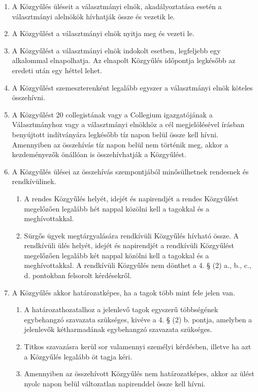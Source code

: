 \documentclass{../styles/rulebook}
\begin{document}
\begin{enumerate}
	\item A Közgyűlés üléseit a választmányi elnök, akadályoztatása esetén a választmányi alelnökök hívhatják össze és vezetik le.
	\item A Közgyűlést a választmányi elnök nyitja meg és vezeti le.
	\item A Közgyűlést a választmányi elnök indokolt esetben, legfeljebb egy alkalommal elnapolhatja. Az elnapolt Közgyűlés időpontja legkésőbb az eredeti után egy héttel lehet.
	\item A Közgyűlést szemeszterenként legalább egyszer a választmányi elnök köteles összehívni.
	\item A Közgyűlést 20 collegistának vagy a Collegium igazgatójának a Választmányhoz vagy a választmányi elnökhöz a cél megjelölésével írásban benyújtott indítványára legkésőbb tíz napon belül össze kell hívni. Amennyiben az összehívás tíz napon belül nem történik meg, akkor a kezdeményezők önállóan is összehívhatják a Közgyűlést.
	\item A Közgyűlés ülései az összehívás szempontjából minősülhetnek rendesnek és rendkívülinek.
	\begin{enumerate}
		\item A rendes Közgyűlés helyét, idejét és napirendjét a rendes Közgyűlést megelőzően legalább hét nappal közölni kell a tagokkal és a meghívottakkal.
		\item Sürgős ügyek megtárgyalására rendkívüli Közgyűlés hívható össze. A rendkívüli ülés helyét, idejét és napirendjét a rendkívüli Közgyűlést megelőzően legalább két nappal közölni kell a tagokkal és a meghívottakkal. A rendkívüli Közgyűlés nem dönthet a 4. § (2) a., b., c., d. pontokban felsorolt kérdésekről.
	\end{enumerate}
	\item A Közgyűlés akkor határozatképes, ha a tagok több mint fele jelen van.
	\begin{enumerate}
		\item A határozathozatalhoz a jelenlevő tagok egyszerű többségének egybehangzó szavazata szükséges, kivéve a 4. § (2) b. pontja, amelyben a jelenlevők kétharmadának egybehangzó szavazata szükséges.
		\item Titkos szavazásra kerül sor valamennyi személyi kérdésben, illetve ha azt a Közgyűlés legalább öt tagja kéri.
		\item Amennyiben az összehívott Közgyűlés nem határozatképes, akkor az ülést nyolc napon belül változatlan napirenddel össze kell hívni.

\end{enumerate}
\end{enumerate}
\end{document}
